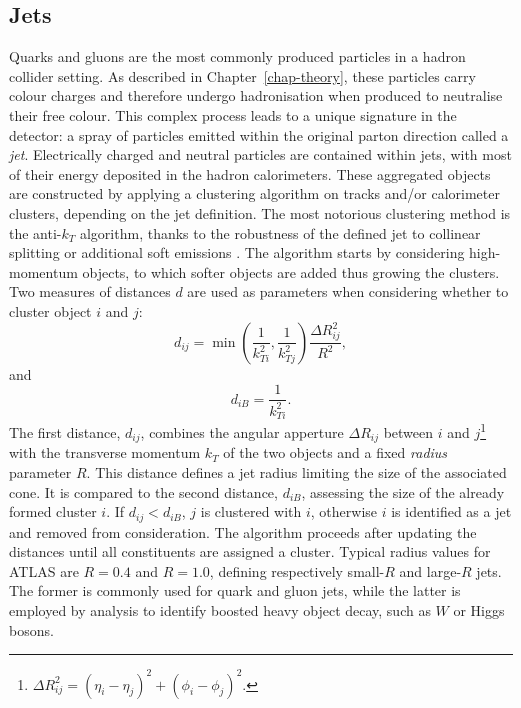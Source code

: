 \subsection{Jets}
Quarks and gluons are the most commonly produced particles in a hadron collider setting. As described in Chapter~\ref{chap-theory}, these particles carry colour charges and therefore undergo hadronisation when produced to neutralise their free colour. This complex process leads to a unique signature in the detector: a spray of particles emitted within the original parton direction called a \textit{jet}. Electrically charged and neutral particles are contained within jets, with most of their energy deposited in the hadron calorimeters. These aggregated objects are constructed by applying a clustering algorithm on tracks and/or calorimeter clusters, depending on the jet definition. The most notorious clustering method is the anti-$k_T$ algorithm, thanks to the robustness of the defined jet to collinear splitting or additional soft emissions \cite{Cacciari:2008gp}. The algorithm starts by considering high-momentum objects, to which softer objects are added thus growing the clusters. Two measures of distances $d$ are used as parameters when considering whether to cluster object $i$ and $j$:
\begin{equation}
  d_{ij} = \min\left(\frac{1}{k_{Ti}^2}, \frac{1}{k_{Tj}^2} \right) \frac{\Delta R_{ij}^2}{R^2},
\end{equation}
and
\begin{equation}
  d_{iB} = \frac{1}{k_{Ti}^2}.
\end{equation}
The first distance, $d_{ij}$, combines the angular apperture $\Delta R_{ij}$ between $i$ and $j$\footnote{$\Delta R_{ij}^2 = (\eta_i - \eta_j)^2 + (\phi_i - \phi_j)^2$.} with the transverse momentum $k_T$ of the two objects and a fixed \textit{radius} parameter $R$. This distance defines a jet radius limiting the size of the associated cone. It is compared to the second distance, $d_{iB}$, assessing the size of the already formed cluster $i$. If $d_{ij} < d_{iB}$, $j$ is clustered with $i$, otherwise $i$ is identified as a jet and removed from consideration. The algorithm proceeds after updating the distances until all constituents are assigned a cluster. Typical radius values for ATLAS are $R = 0.4$ and $R=1.0$, defining respectively small-$R$ and large-$R$ jets. The former is commonly used for quark and gluon jets, while the latter is employed by analysis to identify boosted heavy object decay, such as $W$ or Higgs bosons. \\

